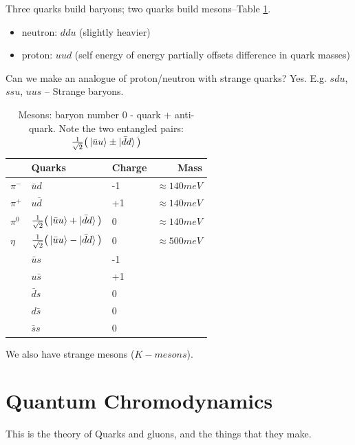 \documentclass[]{article}
\begin{document}
\begin{figure}[H]
\begin{subfigure}{0.45\textwidth}
	\end{subfigure}
\end{figure}

Three quarks build baryons; two quarks build mesons--Table \ref{table:mesons}.
\begin{itemize}
	\item neutron: $ddu$ (slightly heavier)
	\item proton: $uud$ (self energy of energy partially offsets difference in quark masses)
\end{itemize}

Can we make an analogue of proton/neutron with strange quarks? Yes. E.g. $sdu$, $ssu$, $uus$ -- Strange baryons.


\begin{table}[H]
	\begin{center}
		\caption[Mesons: baryon number 0 - quark + anti-quark]{Mesons: baryon number 0 - quark + anti-quark. Note the two entangled pairs: $\frac{1}{\sqrt{2}}\big(\ket{\bar{u}u}\pm\ket{\bar{d}d}\big)$}\label{table:mesons}
		\begin{tabular}{|l|l|l|r|} \hline
			&Quarks&Charge&Mass\\ \hline
			$\pi^-$&$\bar{u}d$&-1&$\approx140 meV$ \\ \hline
			$\pi^+$&$u\bar{d}$&+1&$\approx140 meV$  \\ \hline
			$\pi^0$&$\frac{1}{\sqrt{2}}\big(\ket{\bar{u}u}+\ket{\bar{d}d}\big)$&0&$\approx140 meV$  \\ \hline
			$\eta$&$\frac{1}{\sqrt{2}}\big(\ket{\bar{u}u}-\ket{\bar{d}d}\big)$& 0&$\approx500 meV$ \\ \hline
			&$\bar{u}s$&-1& \\ \hline
			&$u\bar{s}$&+1& \\ \hline
			&$\bar{d}s$&0& \\ \hline
			&$d\bar{s}$&0& \\ \hline
			&$\bar{s}s$&0& \\ \hline
		\end{tabular}
	\end{center}
\end{table}

We also have strange mesons ($K-mesons$).


\section{Quantum Chromodynamics}

This is the theory of Quarks and gluons, and the things that they make.
\end{document}
